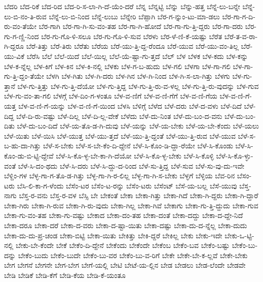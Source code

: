 {ಬೆದರಿ
ಬೆದ-ರಿಕೆ
ಬೆದ-ರಿದ
ಬೆದ-ರಿ-ಸ-ಲಾ-ಗಿ-ದೆ-ಯೆಂ-ದರೆ
ಬೆನ್ನ
ಬೆನ್ನಟ್ಟಿ
ಬೆನ್ನು
ಬೆನ್ನು-ಹತ್ತ
ಬೆನ್ನೆ-ಲು-ಬನ್ನೇ
ಬೆನ್ನೆ-ಲು-ಬಿ-ನಂ-ತಿ-ರುವ
ಬೆನ್ನೆ-ಲು-ಬಿ-ನಿಂದ
ಬೆನ್ನೆ-ಲುಬು
ಬೆನ್ನೇರಿ
ಬೆಪ್ಪಾಗಿ
ಬೆರ-ಗ-ನ್ನುಂ-ಟು-ಮಾ-ಡಲು
ಬೆರ-ಗಾ-ಗ-ದಿ-ರು-ವಂ-ತೆಯೇ
ಬೆರ-ಗಾಗಿ
ಬೆರ-ಗಾ-ಗಿ-ಸು-ವಂ-ತಹ
ಬೆರ-ಗಾ-ಗಿ-ಹೋದೆ
ಬೆರ-ಗಾ-ಗು-ತ್ತಿ-ದ್ದರು
ಬೆರ-ಗಾ-ದರು
ಬೆರ-ಗು-ಗ-ಣ್ಣಿ-ನಿಂದ
ಬೆರ-ಗು-ಗೊ-ಳಿ-ಸಲೂ
ಬೆರ-ಗು-ಗೊ-ಳಿ-ಸುವ
ಬೆರಳು
ಬೆರ-ಳೆ-ಣಿ-ಕೆ-ಯಷ್ಟು
ಬೆರೆತ
ಬೆರೆ-ತ-ವ-ರಾ-ಗಿ-ದ್ದರೂ
ಬೆರೆ-ತಿತ್ತು
ಬೆರೆ-ತಿರು
ಬೆರೆತು
ಬೆರೆಯ
ಬೆರೆ-ಯು-ತ್ತಿ-ದ್ದ-ರೆಂದೂ
ಬೆರೆ-ಯುವ
ಬೆರೆ-ಯು-ವಂ-ತಿಲ್ಲ
ಬೆರೆ-ಯು-ವಿಕೆ
ಬೆರೆಸಿ
ಬೆಲೆ
ಬೆಲೆ-ಯಿದೆ
ಬೆಲೆ-ಯಿಲ್ಲ
ಬೆಲೆ-ಯೆ-ಷ್ಟಾ-ಗು-ತ್ತದೆ
ಬೆಲ್
ಬೆಳ
ಬೆಳಕ
ಬೆಳ-ಕದು
ಬೆಳ-ಕನ್ನು
ಬೆಳ-ಕ-ನ್ನೆಲ್ಲ
ಬೆಳ-ಕಿಗೆ
ಬೆಳ-ಕಿನ
ಬೆಳ-ಕಿ-ನಲ್ಲಿ
ಬೆಳಕು
ಬೆಳ-ಗ-ಬ-ಹುದು
ಬೆಳ-ಗಲಿ
ಬೆಳಗಾ
ಬೆಳ-ಗಾ-ಗಲಿ
ಬೆಳ-ಗಾ-ಗು-ತ್ತಿ-ದ್ದಂ-ತೆಯೇ
ಬೆಳಗಿ
ಬೆಳ-ಗಿತು
ಬೆಳ-ಗಿ-ದರು
ಬೆಳ-ಗಿನ
ಬೆಳ-ಗಿ-ನಿಂದ
ಬೆಳ-ಗಿ-ಸ-ಲಾ-ಗಿತ್ತು
ಬೆಳಗು
ಬೆಳ-ಗು-ತ್ತಾನೆ
ಬೆಳ-ಗು-ತ್ತಿತ್ತು
ಬೆಳ-ಗು-ತ್ತಿ-ದೆಯೋ
ಬೆಳ-ಗು-ತ್ತಿದ್ದ
ಬೆಳ-ಗು-ತ್ತಿ-ರು-ವ-ಳಲ್ಲ
ಬೆಳ-ಗು-ತ್ತಿ-ರು-ವುದನ್ನು
ಬೆಳ-ಗುವ
ಬೆಳ-ಗು-ವಂ-ತಾ-ಗಲಿ
ಬೆಳಗ್ಗೆ
ಬೆಳ-ದಿಂ-ಗ-ಳಂತೂ
ಬೆಳ-ವ-ಣಿಗೆ
ಬೆಳ-ವ-ಣಿ-ಗೆಗೆ
ಬೆಳ-ವ-ಣಿ-ಗೆಯ
ಬೆಳ-ವ-ಣಿ-ಗೆ-ಯತ್ತ
ಬೆಳ-ವ-ಣಿ-ಗೆ-ಯನ್ನು
ಬೆಳ-ವ-ಣಿ-ಗೆ-ಯಿಂದ
ಬೆಳಸಿ
ಬೆಳಿಗ್ಗೆ
ಬೆಳೆದ
ಬೆಳೆ-ದರು
ಬೆಳೆ-ದ-ವಳು
ಬೆಳೆ-ದಿದೆ
ಬೆಳೆ-ದಿದ್ದ
ಬೆಳೆ-ದಿ-ರು-ವಷ್ಟು
ಬೆಳೆ-ದಿಲ್ಲ
ಬೆಳೆ-ದಿ-ಲ್ಲ-ವೇಕೆ
ಬೆಳೆದು
ಬೆಳೆ-ದು-ನಿಂತ
ಬೆಳೆ-ದು-ಬಂ-ದ-ವನು
ಬೆಳೆ-ದು-ಬಂ-ದಿತು
ಬೆಳೆ-ದು-ಬಂ-ದಿದೆ
ಬೆಳೆ-ಯ-ತೊ-ಡ-ಗಿ-ದುವು
ಬೆಳೆ-ಯನ್ನು
ಬೆಳೆ-ಯ-ಬೇಕು
ಬೆಳೆ-ಯ-ಬೇ-ಕೆಂದು
ಬೆಳೆ-ಯಲು
ಬೆಳೆ-ಯಿತು
ಬೆಳೆ-ಯಿಸಿ
ಬೆಳೆ-ಯುತ್ತ
ಬೆಳೆ-ಯು-ತ್ತದೆ
ಬೆಳೆ-ಯು-ತ್ತಿ-ದ್ದಂತೆ
ಬೆಳೆ-ಯು-ತ್ತಿ-ರುವ
ಬೆಳೆ-ಯುವ
ಬೆಳೆ-ಸ-ಬ-ಹು-ದಾ-ಗಿತ್ತು
ಬೆಳೆ-ಸ-ಬೇಕು
ಬೆಳೆ-ಸ-ಬೇ-ಕೆಂ-ದಿ-ದ್ದೇನೆ
ಬೆಳೆ-ಸಿ-ಕೊಂ-ಡಿ-ದ್ದಾ-ರೆಯೇ
ಬೆಳೆ-ಸಿ-ಕೊಂಡು
ಬೆಳೆ-ಸಿ-ಕೊಂ-ಡು-ಬಿ-ಟ್ಟಿ-ದ್ದೇವೆ
ಬೆಳೆ-ಸಿ-ಕೊ-ಳ್ಳ-ಬೇ-ಕಾ-ಗಿ-ದೆಯೋ
ಬೆಳೆ-ಸಿ-ಕೊ-ಳ್ಳ-ಬೇಕು
ಬೆಳೆ-ಸಿ-ಕೊಳ್ಳಿ
ಬೆಳೆ-ಸಿ-ಕೊ-ಳ್ಳು-ವಂತೆ
ಬೆಳೆ-ಸಿ-ದಂ-ಥದು
ಬೆಳೆ-ಸಿ-ದರು
ಬೆಳೆ-ಸಿ-ದ್ದು-ದ-ರಿಂದ
ಬೆಳೆ-ಸು-ತ್ತಿದ್ದ
ಬೆಳೆ-ಸುವ
ಬೆಳೆ-ಸು-ವು-ದು-ಇವೇ
ಬೆಳ್ದಿಂ-ಗಳ
ಬೆಳ್ಳ-ಗಾ-ಗ-ತೊ-ಡ-ಗಿತ್ತು
ಬೆಳ್ಳ-ಗಾ-ಗಿ-ರ-ಲಿಲ್ಲ
ಬೆಳ್ಳ-ಗಾ-ಗಿ-ಸ-ಬೇಕು
ಬೆಳ್ಳಗೆ
ಬೆಳ್ಳಿಯ
ಬೆವ-ರಿನ
ಬೆಸಂ-ಟರು
ಬೆಸಿ-ಲಿ-ಕಾ-ಗ-ಳೆಂದು
ಬೆಸೆಂ-ಟರ
ಬೆಸೆಂ-ಟ-ರನ್ನು
ಬೆಸೆಂ-ಟರು
ಬೆಸೆಂಟ್
ಬೆಸೆ-ಯ-ಬಲ್ಲ
ಬೆಸೆ-ಯುವು
ಬೆಸ್ತ-ನಾಗು
ಬೆಸ್ತ-ರ-ವನು
ಬೆಸ್ತ-ರ-ವಳ
ಬೆಸ್ಸಿ
ಬೇ
ಬೇಕಂತೆ
ಬೇಕಾ
ಬೇಕಾ-ಗಿತ್ತು
ಬೇಕಾ-ಗಿದೆ
ಬೇಕಾ-ಗಿ-ದ್ದರು
ಬೇಕಾ-ಗಿ-ದ್ದಾರೆ
ಬೇಕಾ-ಗಿರು
ಬೇಕಾ-ಗಿ-ರುವ
ಬೇಕಾ-ಗಿ-ರು-ವುದು
ಬೇಕಾ-ಗಿಲ್ಲ
ಬೇಕಾ-ಗಿವೆ
ಬೇಕಾಗು
ಬೇಕಾ-ಗು-ತ್ತಿ-ದ್ದುದು
ಬೇಕಾ-ಗುವ
ಬೇಕಾ-ಗು-ವಂ-ತಹ
ಬೇಕಾ-ಗು-ವಷ್ಟು
ಬೇಕಾದ
ಬೇಕಾ-ದಂ-ತಹ
ಬೇಕಾ-ದಂತೆ
ಬೇಕಾ-ದದ್ದು
ಬೇಕಾ-ದ-ದ್ದೇ-ನಿದೆ
ಬೇಕಾ-ದರೂ
ಬೇಕಾ-ದರೆ
ಬೇಕಾ-ದ-ವರು
ಬೇಕಾ-ದ-ಷ್ಟಾ-ಯಿತು
ಬೇಕಾ-ದಷ್ಟು
ಬೇಕಾ-ದು-ದ-ನ್ನೆಲ್ಲ
ಬೇಕಾ-ದುದು
ಬೇಕಾ-ದು-ದು-ಪ್ರ-ಚಂಡ
ಬೇಕಾ-ಬಿಟ್ಟಿ
ಬೇಕಾ-ಯಿತು
ಬೇಕಿತ್ತು
ಬೇಕಿ-ದ್ದರೆ
ಬೇಕಿಲ್ಲ
ಬೇಕು
ಬೇಕು-ಇದೇ
ಬೇಕು-ಒ-ಟ್ಟಿ-ನಲ್ಲಿ
ಬೇಕು-ಬೇ-ಕೆಂದೇ
ಬೇಕೆ
ಬೇಕೆಂ-ದಿ-ದ್ದೇನೆ
ಬೇಕೆಂದು
ಬೇಕೆಂದೇ
ಬೇಕೆಂಬ
ಬೇಕೆಂ-ಬವ
ಬೇಕೆಂ-ಬಷ್ಟು
ಬೇಕೆಂ-ಬು-ದನ್ನು
ಬೇಕೆಂ-ಬುದು
ಬೇಕೆಂ-ಬುದೇ
ಬೇಕೆಂ-ಬು-ವರ
ಬೇಕೆಂ-ಬು-ವ-ರಿಗೆ
ಬೇಕೇ
ಬೇಕೇ-ಬೇ-ಕ-ಲ್ಲವೆ
ಬೇಕೇ-ಬೇಕು
ಬೇಗ
ಬೇಗನೆ
ಬೇಗನೇ
ಬೇಗ-ಬೇಗ
ಬೇಗೆ-ಯಲ್ಲಿ
ಬೇಟಿ
ಬೇಟೆ-ಯ-ಲ್ಲಿನ
ಬೇಡ
ಬೇಡಲು
ಬೇಡ-ಲೆಂದೇ
ಬೇಡವೇ
ಬೇಡಿ
ಬೇಡಿಕೆ
ಬೇಡಿ-ಕೆಗೆ
ಬೇಡಿ-ಕೆಯ
ಬೇಡಿ-ಕೆ-ಯಂತೂ
}
